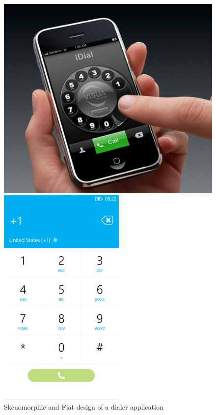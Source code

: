 \documentclass[a4paper,11pt] {article}
\theoremstyle{definition}
\begin{document}
 \begin{figure}[H]
    \centering
    \
    \end{figure}
    \begin{figure}
   \begin{minipage}[c]{.46\linewidth}
      \centering
      \includegraphics[scale=0.4]{fig-report/idial.jpg}

   \end{minipage} \hfill
   \begin{minipage}[c]{.46\linewidth}
   \centering
         \includegraphics[scale=0.5	]{fig-report/dial-flat.png}
   \end{minipage}
   \caption{Skeuomorphic and Flat design of a dialer application}
   \label{fig:skeuoflatCompare}
\end{figure}
\end{document}
